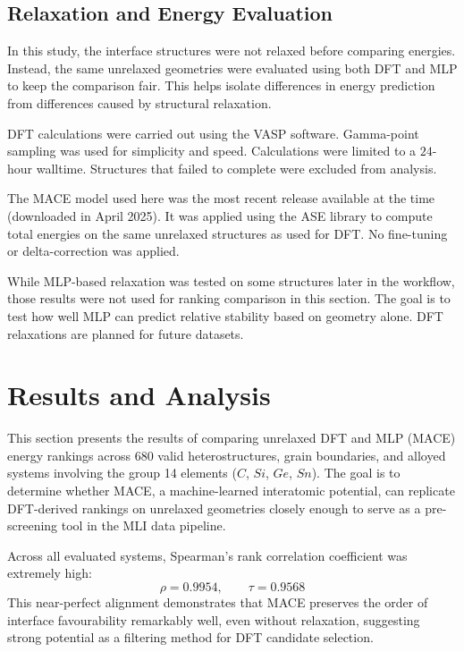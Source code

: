 \newpage \subsection{Relaxation and Energy Evaluation}

In this study, the interface structures were not relaxed before comparing energies.
Instead, the same unrelaxed geometries were evaluated using both DFT and MLP to keep the comparison fair.
This helps isolate differences in energy prediction from differences caused by structural relaxation\cite{artemis_paper}.

DFT calculations were carried out using the VASP software.
Gamma-point sampling was used for simplicity and speed.
Calculations were limited to a $24$-hour walltime.
Structures that failed to complete were excluded from analysis.

The MACE model used here was the most recent release available at the time (downloaded in April 2025).
It was applied using the ASE library to compute total energies on the same unrelaxed structures as used for DFT.
No fine-tuning or delta-correction was applied.

While MLP-based relaxation was tested on some structures later in the workflow, those results were not used for ranking comparison in this section.
The goal is to test how well MLP can predict relative stability based on geometry alone.
DFT relaxations are planned for future datasets.

\section{Results and Analysis} \label{section:results_and_analysis}

This section presents the results of comparing unrelaxed DFT and MLP (MACE) energy rankings across $680$ valid heterostructures, grain boundaries, and alloyed systems involving the group 14 elements ($C$, $Si$, $Ge$, $Sn$).
The goal is to determine whether MACE, a machine-learned interatomic potential, can replicate DFT-derived rankings on unrelaxed geometries closely enough to serve as a pre-screening tool in the MLI data pipeline.

\newpage Across all evaluated systems, Spearman's rank correlation coefficient was extremely high:
\begin{equation}
    \rho = 0.9954, \qquad \tau = 0.9568
\end{equation}
This near-perfect alignment demonstrates that MACE preserves the order of interface favourability remarkably well, even without relaxation, suggesting strong potential as a filtering method for DFT candidate selection.

